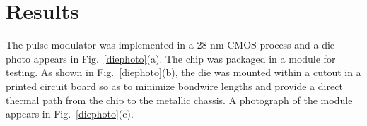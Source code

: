 \documentclass[journal]{IEEEtran}
\begin{document}
\section{Results}
The pulse modulator was implemented in a 28-nm CMOS process and a die photo appears in Fig.~\ref{diephoto}(a). The chip was packaged in a module for testing. As shown in Fig.~\ref{diephoto}(b), the die was mounted within a cutout in a printed circuit board so as to minimize bondwire lengths and provide a direct thermal path from the chip to the metallic chassis. A photograph of the module appears in Fig.~\ref{diephoto}(c). %

\end{document}
